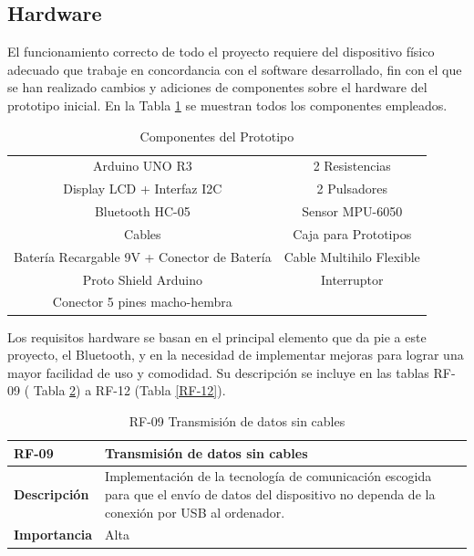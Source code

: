 \subsection{Hardware}
El funcionamiento correcto de todo el proyecto requiere del dispositivo físico adecuado que trabaje en concordancia con el software desarrollado, fin con el que se han realizado cambios y adiciones de componentes sobre el hardware del prototipo inicial. En la Tabla \ref{tab:componentes} se muestran todos los componentes empleados.

\begin{table}[]
    \begin{tabular}{|c|c|}
    \hline
    \rowcolor[HTML]{FFFFFF} 
    \multicolumn{2}{|c|}{\cellcolor[HTML]{FFFFFF}\textbf{Componentes}} \\ \hline 
    \rowcolor[HTML]{EFEFEF} 
    Arduino UNO R3 & 2 Resistencias \\ \hline
    \rowcolor[HTML]{FFFFFF} 
    Display LCD + Interfaz I2C & 2 Pulsadores \\ \hline
    \rowcolor[HTML]{EFEFEF} 
    Bluetooth HC-05 & Sensor MPU-6050 \\ \hline
    \rowcolor[HTML]{FFFFFF} 
    Cables & Caja para Prototipos \\ \hline
    \rowcolor[HTML]{EFEFEF} 
    Batería Recargable 9V + Conector de Batería & Cable Multihilo Flexible \\ \hline
    \rowcolor[HTML]{FFFFFF} 
    Proto Shield Arduino & Interruptor \\ \hline
    \rowcolor[HTML]{EFEFEF} 
    Conector 5 pines macho-hembra & \\ \hline
    \end{tabular}
    \caption{Componentes del Prototipo}
    \label{tab:componentes}
\end{table}



Los requisitos hardware se basan en el principal elemento que da pie a este proyecto, el Bluetooth, y en la necesidad de implementar mejoras para lograr una mayor facilidad de uso y comodidad. Su descripción se incluye en las tablas RF-09 ( Tabla \ref{RF-09}) a RF-12 (Tabla \ref{RF-12}).

\begin{table}[p]
    \centering
    \begin{tabularx}{\linewidth}{ p{} p{} }
        \toprule
        \textbf{RF-09}    & \textbf{Transmisión de datos sin cables}\\
        \toprule
        \textbf{Descripción}              & Implementación de la tecnología de comunicación escogida para que el envío de datos del dispositivo no dependa de la conexión por USB al ordenador.  \\
        \textbf{Importancia}                & Alta \\
        \bottomrule
    \end{tabularx}
    \caption{RF-09 Transmisión de datos sin cables}
    \label{RF-09}
\end{table}

